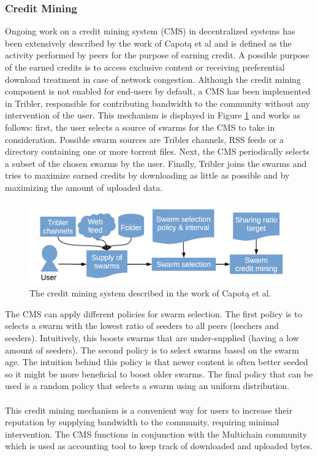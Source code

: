 \subsubsection{\textbf{Credit Mining}}
Ongoing work on a credit mining system (CMS) in decentralized systems has been extensively described by the work of Capot\k{a} et al\cite{capotka2015decentralized} and is defined as the activity performed by peers for the purpose of earning credit. A possible purpose of the earned credits is to access exclusive content or receiving preferential download treatment in case of network congestion. Although the credit mining component is not enabled for end-users by default, a CMS has been implemented in Tribler, responsible for contributing bandwidth to the community without any intervention of the user. This mechanism is displayed in Figure \ref{fig:credit-mining} and works as follows: first, the user selects a source of swarms for the CMS to take in consideration. Possible swarm sources are Tribler channels, RSS feeds or a directory containing one or more torrent files. Next, the CMS periodically selects a subset of the chosen swarms by the user. Finally, Tribler joins the swarms and tries to maximize earned credits by downloading as little as possible and by maximizing the amount of uploaded data.\\

\begin{figure}[h!]
	\centering
	\includegraphics[width=0.7\columnwidth]{images/architecture/credit_mining}
	\caption{The credit mining system described in the work of Capot\k{a} et al.\cite{capotka2015decentralized}}
	\label{fig:credit-mining}
\end{figure}

The CMS can apply different policies for swarm selection. The first policy is to selects a swarm with the lowest ratio of seeders to all peers (leechers and seeders). Intuitively, this boosts swarms that are under-supplied (having a low amount of seeders). The second policy is to select swarms based on the swarm age. The intuition behind this policy is that newer content is often better seeded so it might be more beneficial to boost older swarms. The final policy that can be used is a random policy that selects a swarm using an uniform distribution.\\\\
This credit mining mechanism is a convenient way for users to increase their reputation by supplying bandwidth to the community, requiring minimal intervention. The CMS functions in conjunction with the Multichain community which is used as accounting tool to keep track of downloaded and uploaded bytes.

